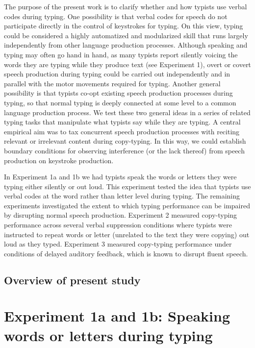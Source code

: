 \documentclass[,man,floatsintext]{apa6}
\begin{document}
The purpose of the present work is to clarify whether and how typists use verbal codes during typing. One possibility is that verbal codes for speech do not participate directly in the control of keystrokes for typing. On this view, typing could be considered a highly automatized and modularized skill that runs largely independently from other language production processes. Although speaking and typing may often go hand in hand, as many typists report silently voicing the words they are typing while they produce text (see Experiment 1), overt or covert speech production during typing could be carried out independently and in parallel with the motor movements required for typing. Another general possibility is that typists co-opt existing speech production processes during typing, so that normal typing is deeply connected at some level to a common language production process. We test these two general ideas in a series of related typing tasks that manipulate what typists say while they are typing. A central empirical aim was to tax concurrent speech production processes with reciting relevant or irrelevant content during copy-typing. In this way, we could establish boundary conditions for observing interference (or the lack thereof) from speech production on keystroke production.

In Experiment 1a and 1b we had typists speak the words or letters they were typing either silently or out loud. This experiment tested the idea that typists use verbal codes at the word rather than letter level during typing. The remaining experiments investigated the extent to which typing performance can be impaired by disrupting normal speech production. Experiment 2 measured copy-typing performance across several verbal suppression conditions where typists were instructed to repeat words or letter (unrelated to the text they were copying) out loud as they typed. Experiment 3 measured copy-typing performance under conditions of delayed auditory feedback, which is known to disrupt fluent speech.

\hypertarget{overview-of-present-study}{%
\subsection{Overview of present study}\label{overview-of-present-study}}

\hypertarget{experiment-1a-and-1b-speaking-words-or-letters-during-typing}{%
\section{Experiment 1a and 1b: Speaking words or letters during typing}\label{experiment-1a-and-1b-speaking-words-or-letters-during-typing}}
\end{document}
